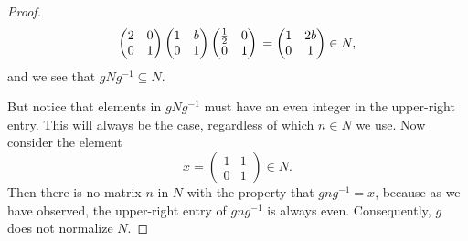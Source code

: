 \begin{enumerate}
\begin{proof}
\begin{equation*}
      \begin{pmatrix}
        2 & 0 \\
        0 & 1
      \end{pmatrix}
      \begin{pmatrix}
        1 & b \\
        0 & 1
      \end{pmatrix}
      \begin{pmatrix}
        \frac12 & 0 \\
        0 & 1
      \end{pmatrix} \\
      =
      \begin{pmatrix}
        1 & 2b \\
        0 & 1
      \end{pmatrix}\in N,
    \end{equation*}
    and we see that $gNg^{-1}\subseteq N$.

    But notice that elements in $gNg^{-1}$ must have an even integer
    in the upper-right entry. This will always be the case, regardless
    of which $n\in N$ we use. Now consider the element
    \begin{equation*}
      x =
      \begin{pmatrix}
        1 & 1 \\
        0 & 1
      \end{pmatrix}\in N.
    \end{equation*}
    Then there is no matrix $n$ in $N$ with the property that
    $gng^{-1} = x$, because as we have observed, the upper-right entry
    of $gng^{-1}$ is always even. Consequently, $g$ does not normalize
    $N$.
  \end{proof}
\end{enumerate}

